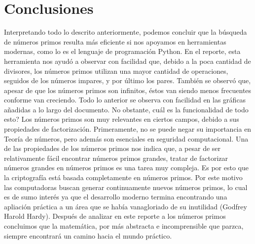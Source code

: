 \newpage
\section{Conclusiones}
Interpretando todo lo descrito anteriormente, podemos concluir que la b\'usqueda de n\'umeros primos resulta m\'as eficiente si nos apoyamos en herramientas modernas, como lo es el lenguaje de programaci\'on Python. En el reporte, esta herramienta nos ayud\'o a observar con facilidad que, debido a la poca cantidad de divisores, los n\'umeros primos utilizan una mayor cantidad de operaciones, seguidos de los n\'umeros impares, y por \'ultimo los pares. Tambi\'en se observ\'o que, apesar de que los n\'umeros primos son infinitos, \'estos van siendo menos frecuentes conforme van creciendo. Todo lo anterior se observa con facilidad en las gr\'aficas a\~nadidas a lo largo del documento. No obstante, \textquestiondown cu\'al es la funcionalidad de todo esto? Los n\'umeros primos son muy relevantes en ciertos campos, debido a sus propiedades de factorizaci\'on. Primeramente, no se puede negar su importancia en Teor\'ia de n\'umeros, pero adem\'as son esenciales en seguridad computacional. Una de las propiedades de los n\'umeros primos nos indica que, a pesar de ser relativamente f\'acil encontrar n\'umeros primos grandes, tratar de factorizar n\'umeros grandes en n\'umeros primos es una tarea muy compleja. Es por esto que la criptograf\'ia est\'a basada completamente en n\'umeros primos. Por este motivo las computadoras buscan generar continuamente nuevos n\'umeros primos, lo cual es de sumo inter\'es ya que el desarrollo moderno termina encontrando una apliaci\'on pr\'actica a un \'area que se hab\'ia vanagloriado de su inutilidad (Godfrey Harold Hardy). Despu\'es de analizar en este reporte a los n\'umeros primos concluimos que la matem\'atica, por m\'as abstracta e incomprensible que parzca, siempre encontrar\'a un camino hacia el mundo pr\'actico.


